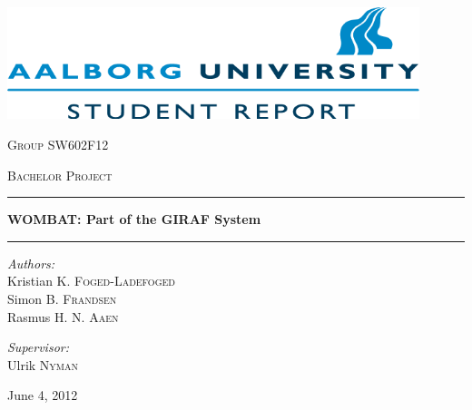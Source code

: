 \begin{titlepage}

\begin{center}

\vspace{1cm}
\includegraphics[width=0.9\textwidth]{Images/aau_logo_en.png}\\[1cm]  
\vspace{1.5cm}  

\textsc{\LARGE Group SW602F12}\\[1.5cm]
\vspace{0.5cm}

\textsc{\Large Bachelor Project}\\[0.5cm]


\hrule
\vspace{0.4cm}

{ \huge \bfseries WOMBAT: Part of the GIRAF System}\\[0.4cm]

\hrule
\vspace{3cm}

\begin{minipage}{0.55\textwidth}
\begin{flushleft} \large
\vspace{1.25cm}
\textit{Authors:}\\
Kristian K. \textsc{Foged-Ladefoged}\\

Simon B. \textsc{Frandsen}\\

Rasmus H. N. \textsc{Aaen}
\end{flushleft}
\end{minipage}
\begin{minipage}{0.35\textwidth}
\begin{flushright} \large
\textit{Supervisor:} \\
Ulrik \textsc{Nyman}
\end{flushright}
\end{minipage}

\vfill

{\large June 4, 2012}

\end{center}

\end{titlepage}

